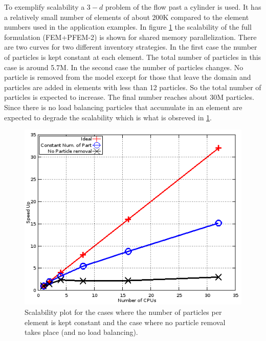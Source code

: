 To exemplify scalability a $3-d$ problem of the flow past a cylinder is used. It has a relatively small number of elements of about 200K compared to the element numbers used in the application examples. 
In figure \ref{fig:scalab} the scalability of the full formulation (FEM+PFEM-2) is shown for shared memory parallelization. There are two curves for two different inventory strategies. In the first case the number of particles is kept constant at each element. The total number of particles in this case is around 5.7M. In the second case the number of particles changes. No particle is removed from the model except for those that leave the domain and particles are added in elements with less than 12 particles. So the total number of particles is expected to increase. The final number reaches about 30M particles. Since there is no load balancing particles that accumulate in an element are expected to degrade the scalability which is what is obsreved in \ref{fig:scalab}.

\begin{figure}[htp] 
\centering 
\includegraphics[scale=.6]{./imgs/scalability.png}
\caption{Scalability plot for the cases where the number of particles per element is kept constant and the case where no particle removal takes place (and no load balancing).}
\label{fig:scalab}
\end{figure}


 

